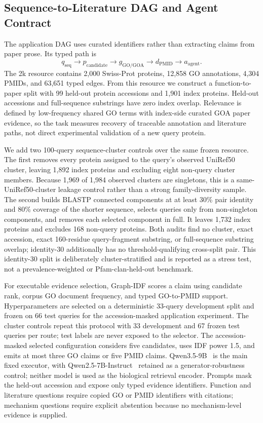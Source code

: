 \documentclass[11pt]{article}
\begin{document}
\subsection{Sequence-to-Literature DAG and Agent Contract}

The application DAG uses curated identifiers rather than extracting claims from paper prose. Its typed path is
\[
q_{\mathrm{seq}} \rightarrow p_{\mathrm{candidate}} \rightarrow g_{\mathrm{GO/GOA}} \rightarrow d_{\mathrm{PMID}} \rightarrow a_{\mathrm{agent}}.
\]
The 2k resource contains 2,000 Swiss-Prot proteins, 12,858 GO annotations, 4,304 PMIDs, and 63,651 typed edges. From this resource we construct a function-to-paper split with 99 held-out protein accessions and 1,901 index proteins. Held-out accessions and full-sequence substrings have zero index overlap. Relevance is defined by low-frequency shared GO terms with index-side curated GOA paper evidence, so the task measures recovery of traceable annotation and literature paths, not direct experimental validation of a new query protein.

We add two 100-query sequence-cluster controls over the same frozen resource. The first removes every protein assigned to the query's observed UniRef50 cluster, leaving 1,892 index proteins and excluding eight non-query cluster members. Because 1,969 of 1,984 observed clusters are singletons, this is a same-UniRef50-cluster leakage control rather than a strong family-diversity sample. The second builds BLASTP connected components at at least 30\% pair identity and 80\% coverage of the shorter sequence, selects queries only from non-singleton components, and removes each selected component in full. It leaves 1,732 index proteins and excludes 168 non-query proteins. Both audits find no cluster, exact accession, exact 160-residue query-fragment substring, or full-sequence substring overlap; identity-30 additionally has no threshold-qualifying cross-split pair. This identity-30 split is deliberately cluster-stratified and is reported as a stress test, not a prevalence-weighted or Pfam-clan-held-out benchmark.

For executable evidence selection, Graph-IDF scores a claim using candidate rank, corpus GO document frequency, and typed GO-to-PMID support. Hyperparameters are selected on a deterministic 33-query development split and frozen on 66 test queries for the accession-masked application experiment. The cluster controls repeat this protocol with 33 development and 67 frozen test queries per route; test labels are never exposed to the selector. The accession-masked selected configuration considers five candidates, uses IDF power 1.5, and emits at most three GO claims or five PMID claims. Qwen3.5-9B~\cite{qwen2026qwen35} is the main fixed executor, with Qwen2.5-7B-Instruct~\cite{qwen2025qwen25} retained as a generator-robustness control; neither model is used as the biological retrieval encoder. Prompts mask the held-out accession and expose only typed evidence identifiers. Function and literature questions require copied GO or PMID identifiers with citations; mechanism questions require explicit abstention because no mechanism-level evidence is supplied.
\end{document}
